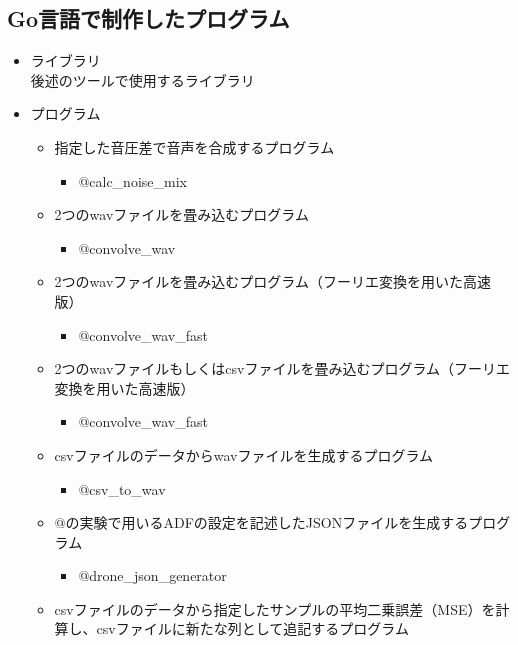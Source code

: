 \subsection{Go言語で制作したプログラム}\label{go}

\begin{itemize}
\item
  ライブラリ \\
  後述のツールで使用するライブラリ
\item
  プログラム

  \begin{itemize}
  \tightlist
  \item
    指定した音圧差で音声を合成するプログラム

    \begin{itemize}
    \tightlist
    \item
      @calc\_noise\_mix
    \end{itemize}
  \item
    2つのwavファイルを畳み込むプログラム

    \begin{itemize}
    \tightlist
    \item
      @convolve\_wav
    \end{itemize}
  \item
    2つのwavファイルを畳み込むプログラム（フーリエ変換を用いた高速版）

    \begin{itemize}
    \tightlist
    \item
      @convolve\_wav\_fast
    \end{itemize}
  \item
    2つのwavファイルもしくはcsvファイルを畳み込むプログラム（フーリエ変換を用いた高速版）

    \begin{itemize}
    \tightlist
    \item
      @convolve\_wav\_fast
    \end{itemize}
  \item
    csvファイルのデータからwavファイルを生成するプログラム

    \begin{itemize}
    \tightlist
    \item
      @csv\_to\_wav
    \end{itemize}
  \item
    @の実験で用いるADFの設定を記述したJSONファイルを生成するプログラム

    \begin{itemize}
    \tightlist
    \item
      @drone\_json\_generator
    \end{itemize}
  \item
    csvファイルのデータから指定したサンプルの平均二乗誤差（MSE）を計算し、csvファイルに新たな列として追記するプログラム


\end{itemize}
\end{itemize}
